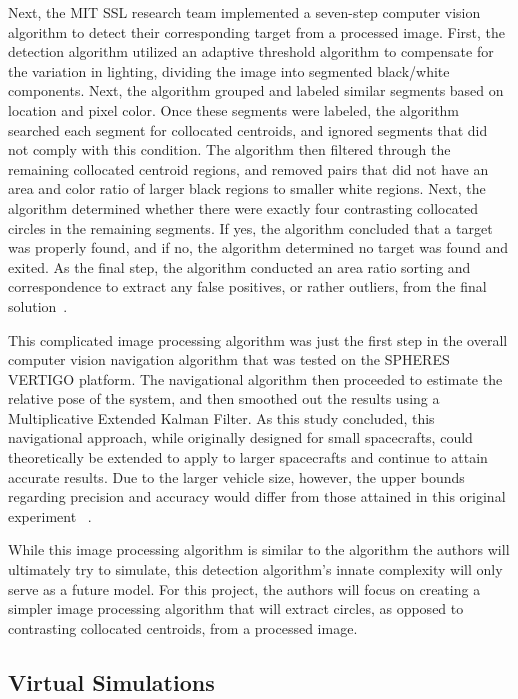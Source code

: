 \documentclass[journal, 10pt]{IEEEtran}
\begin{document}
Next, the MIT SSL research team implemented a seven-step computer vision algorithm to detect their corresponding target from a processed image. First, the detection algorithm utilized an adaptive threshold algorithm to compensate for the variation in lighting, dividing the image into segmented black/white components. Next, the algorithm grouped and labeled similar segments based on location and pixel color. Once these segments were labeled, the algorithm searched each segment for collocated centroids, and ignored segments that did not comply with this condition. The algorithm then filtered through the remaining collocated centroid regions, and removed pairs that did not have an area and color ratio of larger black regions to smaller white regions.  Next, the algorithm determined whether there were exactly four contrasting collocated circles in the remaining segments. If yes, the algorithm concluded that a target was properly found, and if no, the algorithm determined no target was found and exited. As the final step, the algorithm conducted an area ratio sorting and correspondence to extract any false positives, or rather outliers, from the final solution~\cite{Vision, Thesis}.

This complicated image processing algorithm was just the first step in the overall computer vision navigation algorithm that was tested on the SPHERES VERTIGO platform. The navigational algorithm then proceeded to estimate the relative pose of the system, and then smoothed out the results using a Multiplicative Extended Kalman Filter. As this study concluded, this navigational approach, while originally designed for small spacecrafts, could theoretically be extended to apply to larger spacecrafts and continue to attain accurate results. Due to the larger vehicle size, however, the upper bounds regarding precision and accuracy would differ from those attained in this original experiment ~\cite{Vision, Thesis}.

While this image processing algorithm is similar to the algorithm the authors will ultimately try to simulate, this detection algorithm's innate complexity will only serve as a future model. For this project, the authors will focus on creating a simpler image processing algorithm that will extract circles, as opposed to contrasting collocated centroids, from a processed image.

\subsection{Virtual Simulations}
\end{document}
